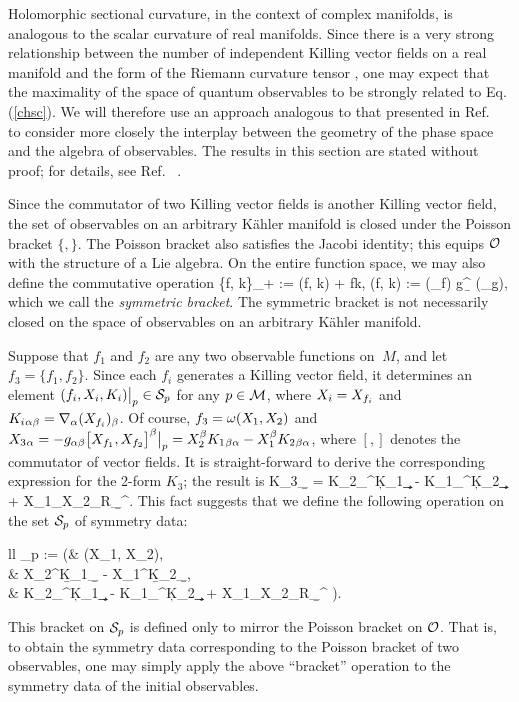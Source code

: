 Holomorphic sectional curvature, in the context of complex manifolds,
is analogous to the scalar curvature of real manifolds.  Since there
is a very strong relationship between the number of independent
Killing vector fields on a real manifold and the form of the Riemann
curvature tensor \cite{ashtekar}, one may expect that the maximality
of the space of quantum observables to be strongly related to
Eq. (\ref{chsc}).  We will therefore use an approach analogous to that
presented in Ref.~\cite{ashtekar} to consider more closely the
interplay between the geometry of the phase space and the algebra of
observables.  The results in this section are stated without proof;
for details, see Ref.~ \cite{thesis}.

Since the commutator of two Killing vector fields is another Killing
vector field, the set of observables on an arbitrary K\"ahler manifold
is closed under the Poisson bracket $\{,\}$.  The Poisson bracket also
satisfies the Jacobi identity; this equips ${\cal O}$ with the
structure of a Lie algebra.  On the entire function space, we may also
define the commutative operation \be \{f, k\}_+ := (f, k) + fk, \quad
(f, k) :=  (\grad_\a f) g^{\a\b} (\grad_\b g), \ee
which we call the {\em symmetric bracket}.  The symmetric bracket is
not necessarily closed on the space of observables on an arbitrary
K\"ahler manifold.

Suppose that $f_1$ and $f_2$ are any two observable functions on $\
M$, and let $f_3 = \{f_1, f_2 \}$.  Since each $f_i$ generates a
Killing vector field, it determines an element $(f_i, X_i, K_i)\big|_p
\in {\cal S}_p$ for any $p \in {\cal M}$, where $X_i = {X_{f_i}}$ and
$K_i{}_{\alpha\beta} = \nabla_\alpha({X_{f_i}})_\beta$.  Of course, $f_3 = \omega(X_1,
X_2)$ and $X_3{}_\alpha = -g_{\alpha\beta} \big[{X_{f_1}}, {X_{f_2}}\big]^\beta
\big|_p = X_2^\beta K_1{}_{\beta\alpha} - X_1^\beta K_2{}_{\beta\alpha}$, where $[,]$
denotes the commutator of vector fields.  It is straight-forward to
derive the corresponding expression for the 2-form $K_3$; the result
is \be K_3{}_{\a\b} = K_2{}_\a{}^\c K_1{}_{\c\b} - K_1{}_\a{}^\c
K_2{}_{\c\b} + X_1{}_\mu X_2{}_\nu R_{\a\b}{}^{\mu\nu}.  \ee This fact
suggests that we define the following operation on the set ${\cal
S}_p$ of symmetry data: 
%
\be \label{pb_p}
\begin{array}{ll}
	\left[ (f_1, X_1, K_1), (f_2, X_2, K_2) \right]_p :=
	\bigg(&
		\w(X_1, X_2), \\
		&  X_2^\b K_1{}_{\b\a} - X_1^\b K_2{}_{\b\a}, \\
		&  K_2{}_\a{}^\c  K_1{}_{\c\b} -
		   K_1{}_\a{}^\c  K_2{}_{\c\b}
		   + X_1{}_\mu X_2{}_\nu R_{\a\b}{}^{\mu\nu} \bigg).
\end{array}
\ee
%
This bracket on ${\cal S}_p$ is defined only to mirror the Poisson
bracket on ${\cal O}$.  That is, to obtain the symmetry data
corresponding to the Poisson bracket of two observables, one may
simply apply the above ``bracket'' operation to the symmetry data of
the initial observables. 

